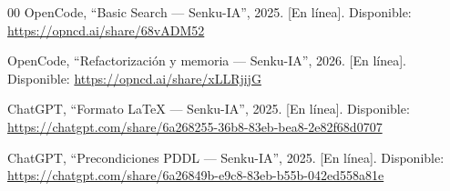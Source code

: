 \documentclass[conference,a4paper]{IEEEtran}
\begin{document}
\begin{thebibliography}{00}
OpenCode, ``Basic Search — Senku-IA'', 2025. [En línea]. Disponible:
\url{https://opncd.ai/share/68vADM52}

OpenCode, ``Refactorización y memoria — Senku-IA'', 2026. [En línea]. Disponible:
\url{https://opncd.ai/share/xLLRjijG}

ChatGPT, ``Formato LaTeX — Senku-IA'', 2025. [En línea]. Disponible:
\url{https://chatgpt.com/share/6a268255-36b8-83eb-bea8-2e82f68d0707}

ChatGPT, ``Precondiciones PDDL — Senku-IA'', 2025. [En línea]. Disponible:
\url{https://chatgpt.com/share/6a26849b-e9c8-83eb-b55b-042ed558a81e}

\end{thebibliography}
\end{document}
